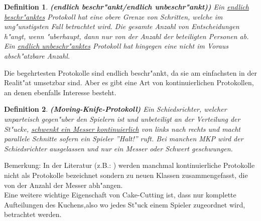 \documentclass[11pt, a4paper, twoside]{article}
\newcommand{\markup}[1]{\uline{#1}}
\let\abk\nomenclature
\newtheorem*{defi}{Definition}
\numberwithin{equation}{section}
\begin{document}
\begin{defi}{\textbf{(endlich beschr"ankt/endlich unbeschr"ankt))}}
\newline Ein \underline{endlich beschr"anktes} Protokoll hat eine obere Grenze von Schritten, welche im ung"unstigsten Fall betrachtet wird. Die gesamte Anzahl von Entscheidungen h"angt, wenn "uberhaupt, dann nur von der Anzahl der beteiligten Personen ab. Ein \underline{endlich unbeschr"anktes} Protokoll hat hingegen eine nicht im Voraus absch"atzbare Anzahl.
\end{defi}
Die begehrtesten Protokolle sind endlich beschr"ankt, da sie am einfachsten in der Realit"at umsetzbar sind. Aber es gibt eine Art von kontinuierlichen Protokollen, an denen ebenfalls Interesse besteht.
\begin{defi}{\textbf{(Moving-Knife-Protokoll)}}
\newline Ein Schiedsrichter, welcher unparteisch gegen"uber den Spielern ist und unbeteiligt an der Verteilung der St"ucke, \underline{schwenkt ein Messer kontinuierlich} von links nach rechts und macht parallele Schnitte sofern ein Spieler ''Halt!'' ruft. Bei manchen MKP\abk{MKP}{\markup{M}oving-\markup{K}nife-\markup{P}rotokoll} wird der Schiedsrichter ausgelassen und nur ein Messer oder Schwert geschwungen.
\end{defi}
Bemerkung: In der Literatur (z.B.: \cite{36}) werden manchmal kontinuierliche Protokolle nicht als Protokolle bezeichnet sondern zu neuen Klassen zusammengefasst, die von der Anzahl der Messer abh"angen.\\
\newline
 Eine weitere wichtige Eigenschaft von Cake-Cutting ist, dass nur komplette Aufteilungen des Kuchens,also wo jedes St"uck einem Spieler zugeordnet wird, betrachtet werden.
\end{document}
